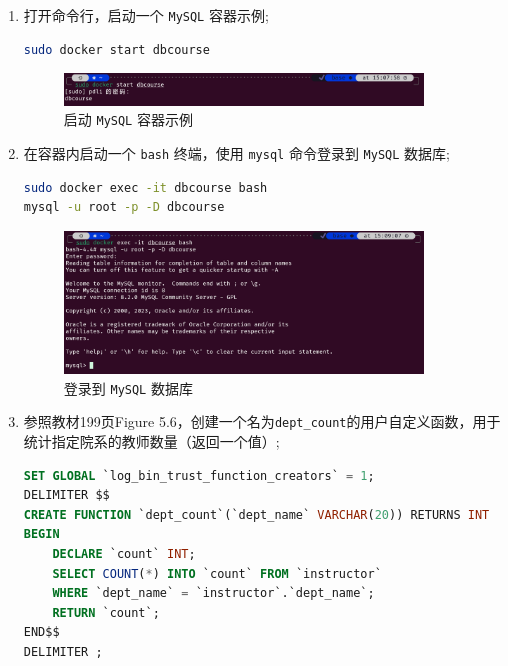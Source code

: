 \documentclass{article}
\begin{document}
\begin{enumerate}
  \item 打开命令行，启动一个 \texttt{MySQL} 容器示例;

        \begin{lstlisting}[language=bash]
sudo docker start dbcourse
\end{lstlisting}

        \begin{figure}[H]
          \centering
          \includegraphics[width=0.9\textwidth]{img/1.png}
          \caption{启动 \texttt{MySQL} 容器示例}
        \end{figure}

  \item 在容器内启动一个 \texttt{bash} 终端，使用 \texttt{mysql} 命令登录到 \texttt{MySQL} 数据库;

        \begin{lstlisting}[language=bash]
sudo docker exec -it dbcourse bash
mysql -u root -p -D dbcourse
\end{lstlisting}

        \begin{figure}[H]
          \centering
          \includegraphics[width=0.9\textwidth]{img/2.png}
          \caption{登录到 \texttt{MySQL} 数据库}
        \end{figure}

  \item 参照教材199页Figure 5.6，创建一个名为\texttt{dept\_count}的用户自定义函数，用于统计指定院系的教师数量（返回一个值）;

        \begin{lstlisting}[language=sql]
SET GLOBAL `log_bin_trust_function_creators` = 1;
DELIMITER $$
CREATE FUNCTION `dept_count`(`dept_name` VARCHAR(20)) RETURNS INT
BEGIN
    DECLARE `count` INT;
    SELECT COUNT(*) INTO `count` FROM `instructor` 
    WHERE `dept_name` = `instructor`.`dept_name`;
    RETURN `count`;
END$$
DELIMITER ;
\end{lstlisting}


\end{enumerate}
\end{document}
